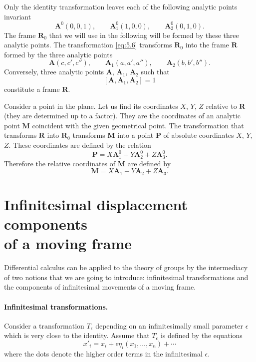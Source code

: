 Only the identity transformation leaves each of the following analytic points invariant
\[
\mathbf{A}^{0}(0,0,1),\qquad
\mathbf{A}^{0}_{1}(1,0,0),\qquad
\mathbf{A}^{0}_{2}(0,1,0).
\]
The frame $\mathbf{R}_{0}$ that we will use in the following will be formed by these three analytic points. The transformation \eqref{eq:5.6} transforms $\mathbf{R}_{0}$ into the frame $\mathbf{R}$ formed by the three analytic points
\[
\mathbf{A}(c,c',c''),\qquad
\mathbf{A}_{1}(a,a',a''),\qquad
\mathbf{A}_{2}(b,b',b'').
\]
Conversely, three analytic points $\mathbf{A}$, $\mathbf{A}_{1}$, $\mathbf{A}_{2}$ such that
\[
[\mathbf{A},\mathbf{A}_{1},\mathbf{A}_{2}]=1
\]
constitute a frame $\mathbf{R}$.

Consider a point in the plane. Let us find its coordinates $X$, $Y$, $Z$ relative to $\mathbf{R}$ (they are determined up to a factor). They are the coordinates of an analytic point $\mathbf{M}$ coincident with the given geometrical point. The transformation that transforms $\mathbf{R}$ into $\mathbf{R}_{0}$ transforms $\mathbf{M}$ into a point $\mathbf{P}$ of absolute coordinates $X$, $Y$, $Z$. These coordinates are defined by the relation
\[
\mathbf{P}=X\mathbf{A}^{0}_{1}+Y\mathbf{A}^{0}_{2}+Z\mathbf{A}^{0}_{3}.
\]
Therefore the relative coordinates of $\mathbf{M}$ are defined by
\[
\mathbf{M}=X\mathbf{A}_{1}+Y\mathbf{A}_{2}+Z\mathbf{A}_{3}.
\]


\section[{Infinitesimal displacement components of a moving frame}]{Infinitesimal displacement components\\of a moving frame}
\label{sec:comp-infin-displ}

Differential calculus can be applied to the theory of groups by the intermediacy of two notions that we are going to introduce: infinitesimal transformations and the components of infinitesimal movements of a moving frame.

\paragraph{Infinitesimal transformations.}
\label{sec:68}
Consider a transformation $T_{\epsilon}$ depending on an infinitesimally small parameter $\epsilon$ which is very close to the identity. Assume that $T_{\epsilon}$ is defined by the equations
\begin{equation}
  \label{eq:5.7}
  x'_{i}=x_{i}+\epsilon\eta_{i}(x_{1},\dots,x_{n})+\cdots
\end{equation}
where the dots denote the higher order terms in the infinitesimal $\epsilon$.

